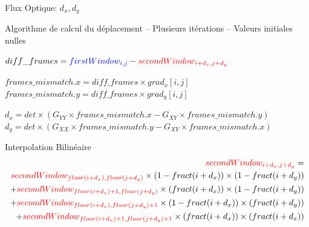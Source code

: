 \documentclass{bredelebeamer}
\begin{document}
\begin{frame}{Flux Optique: $d_{x}, d_{y}$}

	\begin{block}{Algorithme de calcul du déplacement -- Plusieurs itérations -- Valeurs initiales nulles}
\begin{algorithmic}

	\State $diff\_frames = \textcolor{blue}{firstWindow_{i,j}} - \textcolor{red}{secondWindow_{i+d_{x},j+d_{y}}}$

	\State $frames\_mismatch.x = diff\_frames\times grad_{x}[i,j]$
	\State $frames\_mismatch.y = diff\_frames\times grad_{y}[i,j]$

	\EndFor

	\State $d_{x} = det\times (G_{YY}\times frames\_mismatch.x - G_{XY}\times frames\_mismatch.y)$
	\State $d_{y} = det\times (G_{XX}\times frames\_mismatch.y - G_{XY}\times frames\_mismatch.x)$
\end{algorithmic}
\end{block}

	\begin{alertblock}{Interpolation Bilinéaire}
\begin{equation*}
	\begin{split}
		\textcolor{red}{secondWindow_{i+d_{x},j+d_{y}}} =\\
		\textcolor{red}{secondWindow_{floor(i+d_{x}),floor(j+d_{y})}}\times (1-fract(i+d_{x}))\times (1-fract(i+d_{y}))\\
		+ \textcolor{red}{secondWindow_{floor(i+d_{x})+1,floor(j+d_{y})}}\times (fract(i+d_{x}))\times (1-fract(i+d_{y}))\\
		+ \textcolor{red}{secondWindow_{floor(i+d_{x}),floor(j+d_{y})+1}}\times (1-fract(i+d_{x}))\times (fract(i+d_{y}))\\
		+ \textcolor{red}{secondWindow_{floor(i+d_{x})+1,floor(j+d_{y})+1}}\times (fract(i+d_{x}))\times (fract(i+d_{x}))
	\end{split}
\end{equation*}
	\end{alertblock}

\end{frame}

\end{document}
